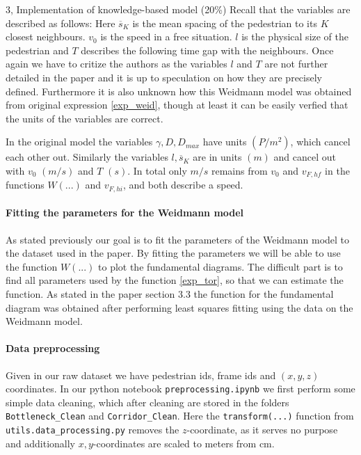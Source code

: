 \begin{task}{3, Implementation of knowledge-based model (20\%)}
Recall that the variables are described as follows: Here $\overline{s}_K$ is the mean spacing of the pedestrian to its $K$ closest neighbours. $v_0$ is the speed in a free situation. $l$ is the physical size of the pedestrian and $T$ describes the following time gap with the neighbours. Once again we have to critize the authors as the variables $l$ and $T$ are not further detailed in the paper and it is up to speculation on how they are precisely defined. Furthermore it is also unknown how this Weidmann model was obtained from original expression \ref{exp_weid}, though at least it can be easily verfied that the units of the variables are correct.

In the original model the variables $\gamma, D, D_{max}$ have units $(P/m^2)$, which cancel each other out. Similarly the variables $l, \overline{s}_K$ are in units $(m)$ and cancel out with $v_0$ $(m/s)$ and $T$ $(s)$. In total only $m/s$ remains from $v_0$ and $v_{F, hf}$ in the functions $W(...)$ and $v_{F, hi}$, and both describe a speed.

\paragraph{Fitting the parameters for the Weidmann model} As stated previously our goal is to fit the parameters of the Weidmann model to the dataset used in the paper\cite{tordeux2020prediction}. By fitting the parameters we will be able to use the function $W(...)$ to plot the fundamental diagrams. The difficult part is to find all parameters used by the function \ref{exp_tor}, so that we can estimate the function. As stated in the paper \cite{tordeux2020prediction} section 3.3 the function for the fundamental diagram was obtained after performing least squares fitting using the data on the Weidmann model.

\paragraph{Data preprocessing} Given in our raw dataset we have pedestrian ids, frame ids and $(x,y,z)$ coordinates. In our python notebook \verb|preprocessing.ipynb| we first perform some simple data cleaning, which after cleaning are stored in the folders \verb|Bottleneck_Clean| and \verb|Corridor_Clean|. Here the \verb|transform(...)| function from \verb|utils.data_processing.py| removes the $z$-coordinate, as it serves no purpose and additionally $x,y$-coordinates are scaled to meters from cm.


\end{task}
